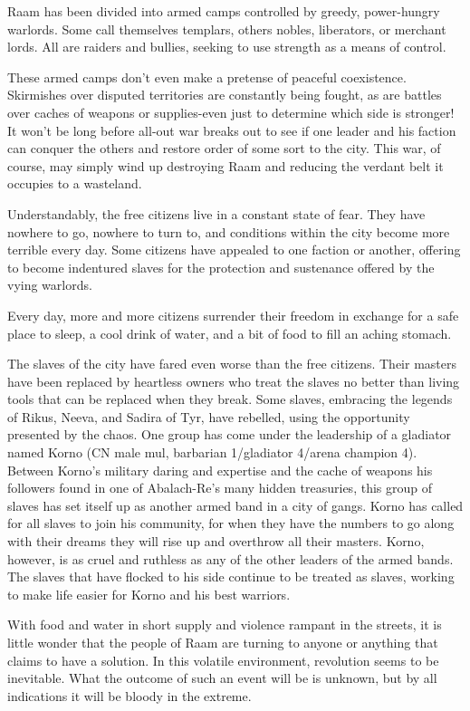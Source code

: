 {	Raam has been divided into armed camps controlled by greedy, power-hungry warlords. Some call themselves templars, others nobles, liberators, or merchant lords. All are raiders and bullies, seeking to use strength as a means of control.

	These armed camps don't even make a pretense of peaceful coexistence. Skirmishes over disputed territories are constantly being fought, as are battles over caches of weapons or supplies-even just to determine which side is stronger! It won't be long before all-out war breaks out to see if one leader and his faction can conquer the others and restore order of some sort to the city. This war, of course, may simply wind up destroying Raam and reducing the verdant belt it occupies to a wasteland.

	Understandably, the free citizens live in a constant state of fear. They have nowhere to go, nowhere to turn to, and conditions within the city become more terrible every day. Some citizens have appealed to one faction or another, offering to become indentured slaves for the protection and sustenance offered by the vying warlords.

	Every day, more and more citizens surrender their freedom in exchange for a safe place to sleep, a cool drink of water, and a bit of food to fill an aching stomach.

	The slaves of the city have fared even worse than the free citizens. Their masters have been replaced by heartless owners who treat the slaves no better than living tools that can be replaced when they break. Some slaves, embracing the legends of Rikus, Neeva, and Sadira of Tyr, have rebelled, using the opportunity presented by the chaos. One group has come under the leadership of a gladiator named Korno (CN male mul, barbarian 1/gladiator 4/arena champion 4). Between Korno's military daring and expertise and the cache of weapons his followers found in one of Abalach-Re's many hidden treasuries, this group of slaves has set itself up as another armed band in a city of gangs. Korno has called for all slaves to join his community, for when they have the numbers to go along with their dreams they will rise up and overthrow all their masters. Korno, however, is as cruel and ruthless as any of the other leaders of the armed bands. The slaves that have flocked to his side continue to be treated as slaves, working to make life easier for Korno and his best warriors.

	With food and water in short supply and violence rampant in the streets, it is little wonder that the people of Raam are turning to anyone or anything that claims to have a solution. In this volatile environment, revolution seems to be inevitable. What the outcome of such an event will be is unknown, but by all indications it will be bloody in the extreme.
}
